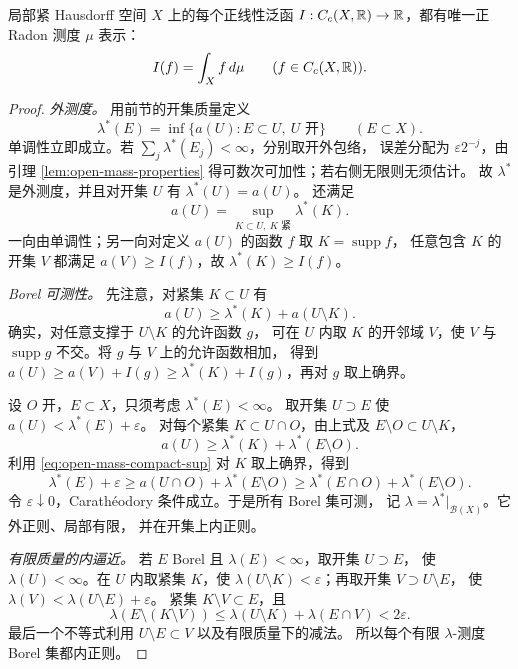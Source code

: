 \begin{theorem}\label{thm:riesz-markov-radon}
局部紧 Hausdorff 空间 \(X\) 上的每个正线性泛函
\(I:C_c(X,\mathbb{R})\to\mathbb{R}\)，都有唯一正 Radon 测度 \(\mu\) 表示：
\[
 I(f)=\int_X f\,d\mu\qquad(f\in C_c(X,\mathbb{R})).
\]
\end{theorem}

\begin{proof}
\emph{外测度。}
用前节的开集质量定义
\[
 \lambda^*(E)=\inf\{a(U):E\subset U,\ U\text{ 开}\}\qquad(E\subset X).
\]
单调性立即成立。若 \(\sum_j\lambda^*(E_j)<\infty\)，分别取开外包络，
误差分配为 \(\varepsilon2^{-j}\)，由引理
\ref{lem:open-mass-properties} 得可数次可加性；若右侧无限则无须估计。
故 \(\lambda^*\) 是外测度，并且对开集 \(U\) 有 \(\lambda^*(U)=a(U)\)。
还满足
\begin{equation}\label{eq:open-mass-compact-sup}
 a(U)=\sup_{K\subset U,\ K\text{ 紧}}\lambda^*(K).
\end{equation}
一向由单调性；另一向对定义 \(a(U)\) 的函数 \(f\) 取 \(K=\operatorname{supp}f\)，
任意包含 \(K\) 的开集 \(V\) 都满足 \(a(V)\ge I(f)\)，故
\(\lambda^*(K)\ge I(f)\)。

\emph{Borel 可测性。}
先注意，对紧集 \(K\subset U\) 有
\begin{equation}\label{eq:compact-open-mass-split}
 a(U)\ge\lambda^*(K)+a(U\setminus K).
\end{equation}
确实，对任意支撑于 \(U\setminus K\) 的允许函数 \(g\)，
可在 \(U\) 内取 \(K\) 的开邻域 \(V\)，使 \(V\) 与
\(\operatorname{supp}g\) 不交。将 \(g\) 与 \(V\) 上的允许函数相加，
得到 \(a(U)\ge a(V)+I(g)\ge\lambda^*(K)+I(g)\)，再对 \(g\) 取上确界。

设 \(O\) 开，\(E\subset X\)，只须考虑 \(\lambda^*(E)<\infty\)。
取开集 \(U\supset E\) 使 \(a(U)<\lambda^*(E)+\varepsilon\)。
对每个紧集 \(K\subset U\cap O\)，由上式及 \(E\setminus O\subset U\setminus K\)，
\[
 a(U)\ge\lambda^*(K)+\lambda^*(E\setminus O).
\]
利用 \eqref{eq:open-mass-compact-sup} 对 \(K\) 取上确界，得到
\[
 \lambda^*(E)+\varepsilon
 \ge a(U\cap O)+\lambda^*(E\setminus O)
 \ge\lambda^*(E\cap O)+\lambda^*(E\setminus O).
\]
令 \(\varepsilon\downarrow0\)，Carathéodory 条件成立。于是所有 Borel 集可测，
记 \(\lambda=\lambda^*|_{\mathcal B(X)}\)。它外正则、局部有限，
并在开集上内正则。

\emph{有限质量的内逼近。}
若 \(E\) Borel 且 \(\lambda(E)<\infty\)，取开集 \(U\supset E\)，
使 \(\lambda(U)<\infty\)。在 \(U\) 内取紧集 \(K\)，使
\(\lambda(U\setminus K)<\varepsilon\)；再取开集 \(V\supset U\setminus E\)，
使 \(\lambda(V)<\lambda(U\setminus E)+\varepsilon\)。
紧集 \(K\setminus V\subset E\)，且
\[
 \lambda(E\setminus(K\setminus V))
 \le\lambda(U\setminus K)+\lambda(E\cap V)<2\varepsilon.
\]
最后一个不等式利用 \(U\setminus E\subset V\) 以及有限质量下的减法。
所以每个有限 \(\lambda\)-测度 Borel 集都内正则。


\end{proof}

